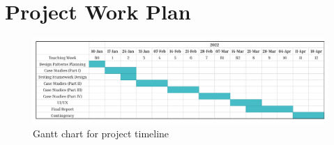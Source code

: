 \section{Project Work Plan}

\begin{figure}[h]
	\centering
	\includegraphics[width=1.0\linewidth]{./assets/images/work-plan-gantt.pdf}
	\caption{Gantt chart for project timeline}
	\label{fig:work-plan-gantt}
\end{figure}

